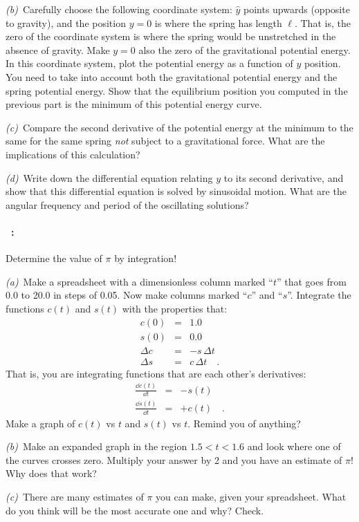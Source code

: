 \documentclass[12pt]{article}
\begin{document}
\textsl{(b)}~Carefully choose the following coordinate system:
$\hat{y}$ points upwards (opposite to gravity), and the position $y=0$
is where the spring has length $\ell$. That is, the zero of the
coordinate system is where the spring would be unstretched in the
absence of gravity. Make $y=0$ also the zero of the gravitational
potential energy. In this coordinate system, plot the potential energy
as a function of $y$ position. You need to take into account both the
gravitational potential energy and the spring potential energy. Show
that the equilibrium position you computed in the previous part is the
minimum of this potential energy curve.

\textsl{(c)}~Compare the second derivative of the potential energy at
the minimum to the same for the same spring \emph{not} subject to a
gravitational force. What are the implications of this calculation?

\textsl{(d)}~Write down the differential equation relating $y$ to its
second derivative, and show that this differential equation is solved
by sinusoidal motion. What are the angular frequency and period of the
oscillating solutions?

\paragraph{\problemname~\theproblem:}%
Determine the value of $\pi$ by integration!

\textsl{(a)}~Make a spreadsheet with a dimensionless column marked
``$t$'' that goes from 0.0 to 20.0 in steps of 0.05.  Now make columns
marked ``$c$'' and ``$s$''.  Integrate the functions $c(t)$ and
$s(t)$ with the properties that:
\begin{eqnarray}\displaystyle
  c(0) & = & 1.0 \\
  s(0) & = & 0.0 \\
  \Delta c & = & -s\,\Delta t \\
  \Delta s & = & c\,\Delta t
  \quad .
\end{eqnarray}
That is, you are integrating functions that are each other's derivatives:
\begin{eqnarray}\displaystyle
  \frac{\dd c(t)}{\dd t} &=& -s(t) \\
  \frac{\dd s(t)}{\dd t} &=& +c(t)
  \quad .
\end{eqnarray}
Make a graph of $c(t)$ vs $t$ and $s(t)$ vs $t$.  Remind you of anything?

\textsl{(b)}~Make an expanded graph in the region $1.5<t<1.6$ and
look where one of the curves crosses zero.  Multiply your answer by 2 and you
have an estimate of $\pi$!  Why does that work?

\textsl{(c)}~There are many estimates of $\pi$ you can make, given
your spreadsheet. What do you think will be the most accurate one and
why? Check.
\end{document}

